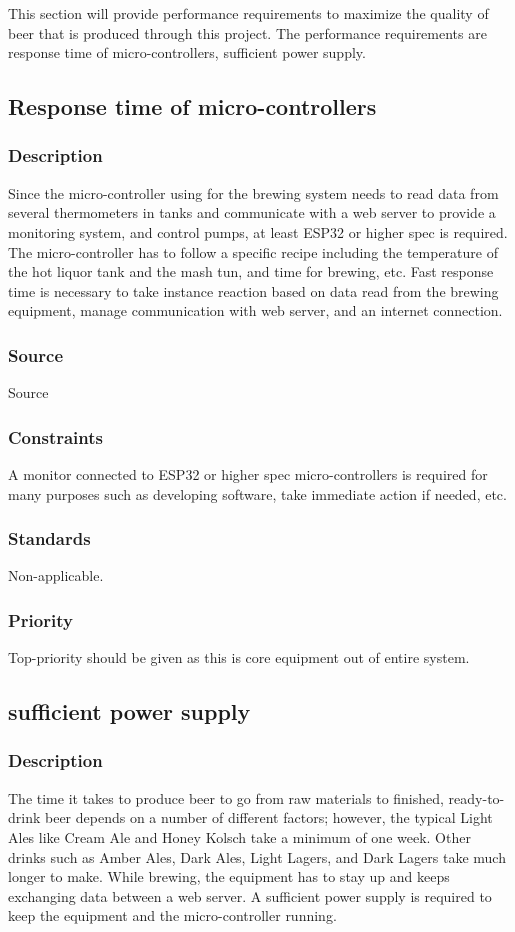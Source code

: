 This section will provide performance requirements to maximize the quality of beer that is produced through this project. The performance requirements are response time of micro-controllers, sufficient power supply.

\subsection{Response time of micro-controllers}
\subsubsection{Description}
Since the micro-controller using for the brewing system needs to read data from several thermometers in tanks and communicate with a web server to provide a monitoring system, and control pumps, at least ESP32 or higher spec is required. The micro-controller has to follow a specific recipe including the temperature of the hot liquor tank and the mash tun, and time for brewing, etc.  Fast response time is necessary to take instance reaction based on data read from the brewing equipment, manage communication with web server, and an internet connection.
\subsubsection{Source}
Source
\subsubsection{Constraints}
A monitor connected to ESP32 or higher spec micro-controllers is required for many purposes such as developing software, take immediate action if needed, etc.
\subsubsection{Standards}
Non-applicable.
\subsubsection{Priority}
Top-priority should be given as this is core equipment out of entire system.
\newline

\subsection{sufficient power supply}

\subsubsection{Description}
The time it takes to produce beer to go from raw materials to finished, ready-to-drink beer depends on a number of different factors; however, the typical Light Ales like Cream Ale and Honey Kolsch take a minimum of one week. Other drinks such as Amber Ales, Dark Ales, Light Lagers, and Dark Lagers take much longer to make. While brewing, the equipment has to stay up and keeps exchanging data between a web server. A sufficient power supply is required to keep the equipment and the micro-controller running.
